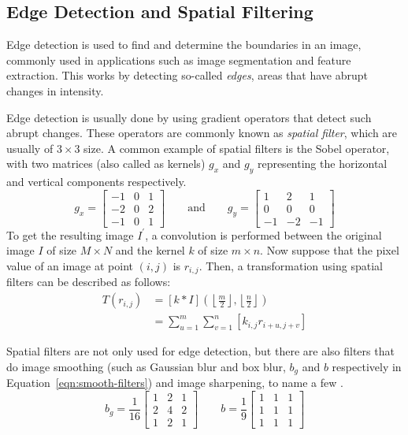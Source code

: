 \subsection{Edge Detection and Spatial Filtering}
Edge detection is used to find and determine the boundaries in an image, commonly used in applications such as image segmentation and feature extraction. This works by detecting so-called \textit{edges}, areas that have abrupt changes in intensity.

Edge detection is usually done by using gradient operators that detect such abrupt changes. These operators are commonly known as \textit{spatial filter}, which are usually of $3 \times 3$ size. A common example of spatial filters is the Sobel operator, with two matrices (also called as kernels) $g_x$ and $g_y$ representing the horizontal and vertical components respectively.
\begin{equation}
    g_x =
    \begin{bmatrix}
        -1 & 0 & 1 \\
        -2 & 0 & 2 \\
        -1 & 0 & 1
    \end{bmatrix}
    \qquad\text{and}\qquad
    g_y =
    \begin{bmatrix}
        1 & 2 & 1 \\
        0 & 0 & 0 \\
        -1 & -2 & -1
    \end{bmatrix}
\end{equation}
To get the resulting image $I^\prime$, a convolution is performed between the original image $I$ of size $M \times N$ and the kernel $k$ of size $m \times n$. Now suppose that the pixel value of an image at point $\left(i,j\right)$ is $r_{i,j}$. Then, a transformation using spatial filters can be described as follows:
\begin{align}
    T\left(r_{i,j}\right) &= \left[k * I\right]\left(\left\lfloor\frac{m}{2}\right\rfloor, \left\lfloor\frac{n}{2}\right\rfloor \right) \\
                         &= \sum_{u=1}^{m} \sum_{v=1}^{n} \left[k_{i,j} r_{i+u, j+v} \right]
\end{align}

Spatial filters are not only used for edge detection, but there are also filters that do image smoothing (such as Gaussian blur and box blur, $b_g$ and $b$ respectively in Equation~\ref{eqn:smooth-filters}) and image sharpening, to name a few \cite{gonzalez_digital_2008}.
\begin{equation}
    \label{eqn:smooth-filters}
    b_g = \frac{1}{16}
    \begin{bmatrix}
        1 & 2 & 1 \\
        2 & 4 & 2 \\
        1 & 2 & 1
    \end{bmatrix}
    \qquad
    b = \frac{1}{9}
    \begin{bmatrix}
        1 & 1 & 1 \\
        1 & 1 & 1 \\
        1 & 1 & 1
    \end{bmatrix}
\end{equation}
